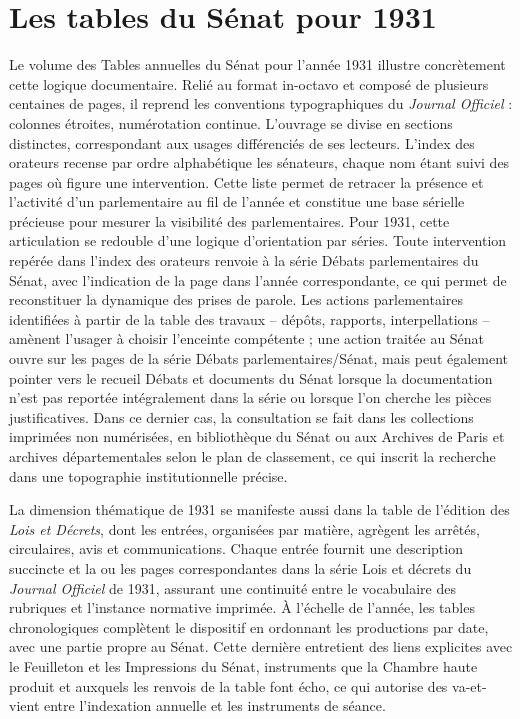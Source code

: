 \section{Les tables du Sénat pour 1931}

Le volume des Tables annuelles du Sénat pour l’année 1931 illustre concrètement cette logique documentaire. Relié au format in-octavo et composé de plusieurs centaines de pages, il reprend les conventions typographiques du \emph{Journal Officiel} : colonnes étroites, numérotation continue. L’ouvrage se divise en sections distinctes, correspondant aux usages différenciés de ses lecteurs. L’index des orateurs recense par ordre alphabétique les sénateurs, chaque nom étant suivi des pages où figure une intervention. Cette liste permet de retracer la présence et l’activité d’un parlementaire au fil de l’année et constitue une base sérielle précieuse pour mesurer la visibilité des parlementaires. Pour 1931, cette articulation se redouble d’une logique d’orientation par séries. Toute intervention repérée dans l’index des orateurs renvoie à la série Débats parlementaires du Sénat, avec l’indication de la page dans l’année correspondante, ce qui permet de reconstituer la dynamique des prises de parole. Les actions parlementaires identifiées à partir de la table des travaux – dépôts, rapports, interpellations – amènent l’usager à choisir l’enceinte compétente ; une action traitée au Sénat ouvre sur les pages de la série Débats parlementaires/Sénat, mais peut également pointer vers le recueil Débats et documents du Sénat lorsque la documentation n’est pas reportée intégralement dans la série ou lorsque l’on cherche les pièces justificatives. Dans ce dernier cas, la consultation se fait dans les collections imprimées non numérisées, en bibliothèque du Sénat ou aux Archives de Paris et archives départementales selon le plan de classement, ce qui inscrit la recherche dans une topographie institutionnelle précise.

La dimension thématique de 1931 se manifeste aussi dans la table de l’édition des \emph{Lois et Décrets}, dont les entrées, organisées par matière, agrègent les arrêtés, circulaires, avis et communications. Chaque entrée fournit une description succincte et la ou les pages correspondantes dans la série Lois et décrets du \emph{Journal Officiel} de 1931, assurant une continuité entre le vocabulaire des rubriques et l’instance normative imprimée. À l’échelle de l’année, les tables chronologiques complètent le dispositif en ordonnant les productions par date, avec une partie propre au Sénat. Cette dernière entretient des liens explicites avec le Feuilleton et les Impressions du Sénat, instruments que la Chambre haute produit et auxquels les renvois de la table font écho, ce qui autorise des va-et-vient entre l’indexation annuelle et les instruments de séance.
